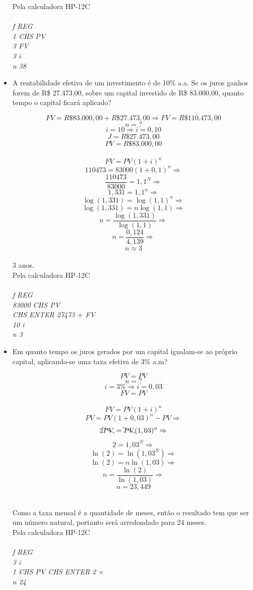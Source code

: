 \documentclass[a4paper, 12pt]{article}
\begin{document}
\begin{itemize}
Pela calculadora HP-12C\\\\
\emph{f REG}\\
\emph{1 CHS PV}\\
\emph{3 FV}\\
\emph{3 i}\\
\emph{n 38}  

\item  A rentabilidade efetiva de um investimento é de 10\% a.a. Se os juros 
ganhos forem de R\$ 27.473,00, sobre um capital investido de R\$ 83.000,00, 
quanto tempo o capital ficará aplicado?

$$ FV = R\$83.000,00 +  R\$27.473,00 \Rightarrow FV = R\$110.473,00  $$
$$ n = ? $$
$$ i = 10 \Rightarrow i = 0,10 $$
$$ J = R\$27.473,00 $$
$$ PV = R\$83.000,00 $$
\\
$$ FV = PV(1+i)^n $$
$$ 110473 = 83000(1+0,1)^{n} \Rightarrow $$
$$ \frac{110473}{83000} = 1,1^N \Rightarrow $$
$$ 1,331 = 1,1^{n} \Rightarrow $$
$$ \log(1,331) = \log(1,1)^{n} \Rightarrow $$
$$ \log(1,331) = n \log(1,1) \Rightarrow $$
$$ n  = \frac{\log(1,331)}{\log(1,1)} \Rightarrow $$
$$ n  = \frac{0,124}{4,139} \Rightarrow $$
$$ \boxed{n  \approx 3} $$
\\

3 anos. \\

Pela calculadora HP-12C\\\\
\emph{f REG}\\
\emph{83000 CHS PV}\\
\emph{CHS ENTER 27473 $+$ FV}\\
\emph{10 i}\\
\emph{n 3}  

\item Em quanto tempo os juros gerados por um capital igualam-se ao próprio 
capital, aplicando-se uma taxa efetiva de 3\% a.m?
  
$$ PV = PV  $$
$$ n = ? $$
$$ i = 3 \% \Rightarrow i = 0,03 $$
$$ FV = PV $$
\\
$$ FV = PV(1+i)^n $$
$$ PV = PV(1+0,03)^n - PV \Rightarrow $$
$$ 2 \bcancel{PV} = \bcancel{PV}(1,03)^{n} \Rightarrow $$
$$ 2 = 1,03^N \Rightarrow $$
$$ \ln(2) = \ln(1,03^N) \Rightarrow $$
$$ \ln(2) = n \ln(1,03) \Rightarrow $$
$$ n = \frac{\ln(2)}{\ln(1,03)} \Rightarrow $$
$$ \boxed{n = 23,449} $$

\\

Como a taxa mensal é a quantidade de meses, então o resultado tem que ser um número natural, portanto será arredondado para 24 meses. \\

Pela calculadora HP-12C\\\\
\emph{f REG}\\
\emph{3 i}\\
\emph{1 CHS PV CHS ENTER 2 $ \times $ }\\
\emph{n 24}

\end{itemize}
\end{document}
